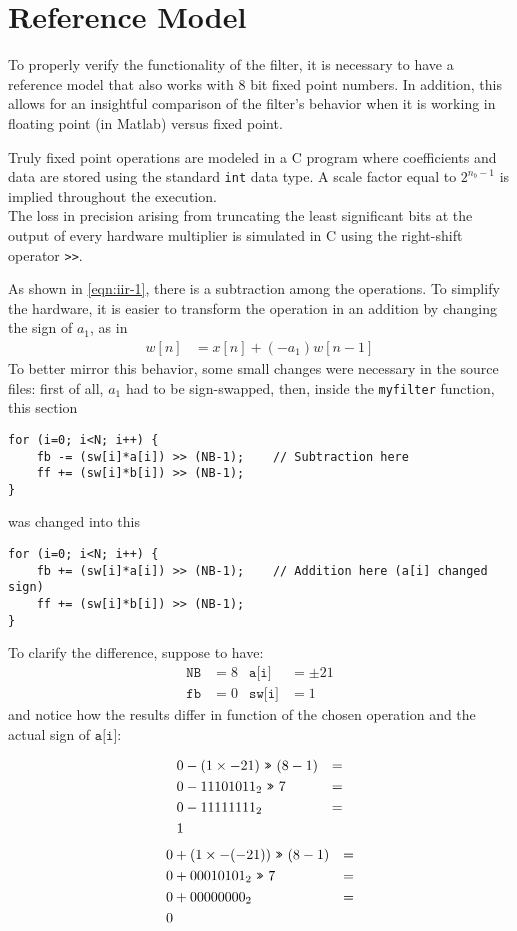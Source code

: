 \section{Reference Model}
To properly verify the functionality of the filter, it is necessary to have a reference model that also works with 8 bit fixed point numbers. In addition, this allows for an insightful comparison of the filter's behavior when it is working in floating point (in Matlab) versus fixed point.


Truly fixed point operations are modeled in a C program where coefficients and data are stored using the standard \texttt{int} data type. A scale factor equal to $2^{n_b-1}$ is implied throughout the execution.\\
The loss in precision arising from truncating the least significant bits at the output of every hardware multiplier is simulated in C using the right-shift operator \texttt{>>}.

As shown in \autoref{eqn:iir-1}, there is a subtraction among the operations. To simplify the hardware, it is easier to transform the operation in an addition by changing the sign of $a_1$, as in
\begin{align}
	w[n] &= x[n] + (- a_1) w[n-1]
\end{align}
To better mirror this behavior, some small changes were necessary in the source files: first of all, $a_1$ had to be sign-swapped, then, inside the \texttt{myfilter} function, this section
\begin{Verbatim}
for (i=0; i<N; i++) {
	fb -= (sw[i]*a[i]) >> (NB-1);    // Subtraction here
	ff += (sw[i]*b[i]) >> (NB-1);
}
\end{Verbatim}
was changed into this
\begin{Verbatim}
for (i=0; i<N; i++) {
	fb += (sw[i]*a[i]) >> (NB-1);    // Addition here (a[i] changed sign)
	ff += (sw[i]*b[i]) >> (NB-1);
}
\end{Verbatim}
To clarify the difference, suppose to have:
\begin{align*}
	\texttt{NB} &= 8 & \texttt{a[i]} &= \pm21 \\
	\texttt{fb} &= 0 & \texttt{sw[i]} &= 1
\end{align*}
and notice how the results differ in function of the chosen operation and the actual sign of $\texttt{a[i]}$:
\setlength{\columnseprule}{0.4pt}
\begin{multicols}{2}
	\noindent
	\begin{align*}
		0 &- (1 \times -21) \ \texttt{>>}\  (8 - 1) &= \\
		0 &- 11101011_2 \ \texttt{>>}\  7 &= \\
		0 &- 11111111_2 &= \\
		1&
	\end{align*}
	\begin{align*}
		0 &+ (1 \times -(-21)) \ \texttt{>>}\  (8 - 1) &= \\
		0 &+ 00010101_2 \ \texttt{>>}\  7 &= \\
		0 &+ 00000000_2 &= \\
		0&
	\end{align*}
\end{multicols}
